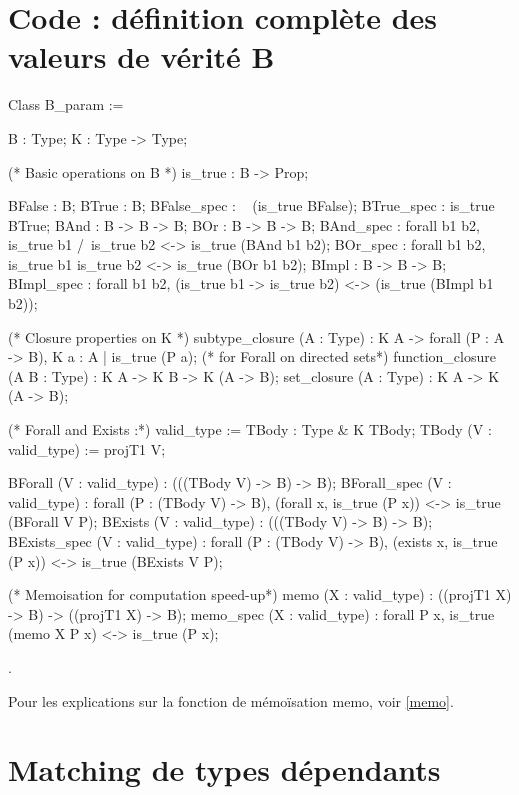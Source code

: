 \documentclass{article}
\newcommand\code[1]{{\fontfamily{lmtt}\selectfont #1}}
\theoremstyle{definition}
\begin{document}



\newpage

\appendix

\section{Code : définition complète des valeurs de vérité B}
\label{annexe}

\begin{coq}
Class B_param := { B : Type;
  K : Type -> Type;
  
  (* Basic operations on B *)
  is_true : B -> Prop;
  
  BFalse : B;
  BTrue : B;
  BFalse_spec : ~ (is_true BFalse);
  BTrue_spec : is_true BTrue;
  BAnd : B -> B -> B;
  BOr : B -> B -> B;
  BAnd_spec : forall b1 b2, is_true b1 /\ is_true b2 <-> is_true (BAnd b1 b2);
  BOr_spec : forall b1 b2, is_true b1 \/ is_true b2 <-> is_true (BOr b1 b2);
  BImpl : B -> B -> B;
  BImpl_spec : forall b1 b2, (is_true b1 -> is_true b2) <-> (is_true (BImpl b1 b2));
  
  (* Closure properties on K *)
  subtype_closure (A : Type) : K A -> forall (P : A -> B), K {a : A | is_true (P a)}; (* for Forall on directed sets*)
  function_closure (A B : Type) : K A -> K B -> K (A -> B);
  set_closure (A : Type) : K A -> K (A -> B);

  (* Forall and Exists :*)
  valid_type := { TBody : Type & K TBody};
  TBody (V : valid_type) := projT1 V;
  
  BForall (V : valid_type) : (((TBody V) -> B) -> B);
  BForall_spec (V : valid_type) : forall (P : (TBody V) -> B), 
    (forall x, is_true (P x)) <-> is_true (BForall V P);
  BExists (V : valid_type) : (((TBody V) -> B) -> B);
  BExists_spec (V : valid_type) : forall (P : (TBody V) -> B), 
    (exists x, is_true (P x)) <-> is_true (BExists V P);
  
  
  (* Memoisation for computation speed-up*)
  memo (X : valid_type) : ((projT1 X) -> B) -> ((projT1 X) -> B);
  memo_spec (X : valid_type) : forall P x, is_true (memo X P x) <-> is_true (P x);
  }.
\end{coq}


Pour les explications sur la fonction de mémoïsation \code{memo}, voir \ref{memo}.

\newpage

\section{Matching de types dépendants}
\label{dep}
\end{document}
